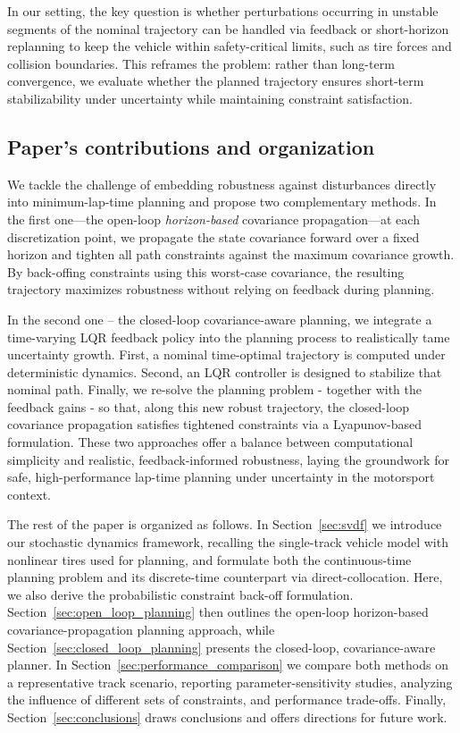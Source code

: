 In our setting, the key question is whether perturbations occurring in unstable segments of the nominal trajectory can be handled via feedback or short-horizon replanning to keep the vehicle within safety-critical limits, such as tire forces and collision boundaries. This reframes the problem: rather than long-term convergence, we evaluate whether the planned trajectory ensures short-term stabilizability under uncertainty while maintaining constraint satisfaction.



\subsection{Paper's contributions and organization}
We tackle the challenge of embedding robustness against disturbances directly into minimum-lap-time planning and propose two complementary methods. In the first one---the open-loop \emph{horizon-based} covariance propagation---at each discretization point, we propagate the state covariance forward over a fixed horizon and tighten all path constraints against the maximum covariance growth. By back-offing constraints using this worst-case covariance, the resulting trajectory maximizes robustness without relying on feedback during planning.

In the second one -- the closed-loop covariance-aware planning, we integrate a time-varying LQR feedback policy into the planning process to realistically tame uncertainty growth. First, a nominal time-optimal trajectory is computed under deterministic dynamics. Second, an LQR controller is designed to stabilize that nominal path. Finally, we re-solve the planning problem - together with the feedback gains - so that, along this new robust trajectory, the closed-loop covariance propagation satisfies tightened constraints via a Lyapunov-based formulation. These two approaches offer a balance between computational simplicity and realistic, feedback-informed robustness, laying the groundwork for safe, high-performance lap-time planning under uncertainty in the motorsport context.

The rest of the paper is organized as follows.
In Section~\ref{sec:svdf} we introduce our stochastic dynamics framework, recalling the single-track vehicle model with nonlinear tires used for planning, and formulate both the continuous-time planning problem and its discrete-time counterpart via direct-collocation. Here, we also derive the probabilistic constraint back-off formulation.
Section~\ref{sec:open_loop_planning} then outlines the open-loop horizon-based covariance-propagation planning approach, while Section~\ref{sec:closed_loop_planning} presents the closed-loop, covariance-aware planner. In Section~\ref{sec:performance_comparison} we compare both methods on a representative track scenario, reporting parameter-sensitivity studies, analyzing the influence of different sets of constraints, and performance trade-offs.
Finally, Section~\ref{sec:conclusions} draws conclusions and offers directions for future work.
  